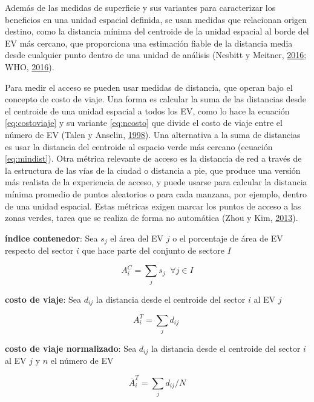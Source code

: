 \documentclass[12pt,a4paper,oneside, openany]{book}
\theoremstyle{definition}
\theoremstyle{definition}
\theoremstyle{definition}
\theoremstyle{remark}
\begin{document}
Además de las medidas de superficie y sus variantes para caracterizar
los beneficios en una unidad espacial definida, se usan medidas que
relacionan origen destino, como la distancia mínima del centroide de la
unidad espacial al borde del EV más cercano, que proporciona una
estimación fiable de la distancia media desde cualquier punto dentro de
una unidad de análisis (Nesbitt y Meitner,
\protect\hyperlink{ref-nesbitt_exploring_2016}{2016}; WHO,
\protect\hyperlink{ref-who2016urban}{2016}).

Para medir el acceso se pueden usar medidas de distancia, que operan
bajo el concepto de costo de viaje. Una forma es calcular la suma de las
distancias desde el centroide de una unidad espacial a todos los EV,
como lo hace la ecuación \eqref{eq:costoviaje} y su variante
\eqref{eq:ncosto} que divide el costo de viaje entre el número de EV
(Talen y Anselin, \protect\hyperlink{ref-talen_assessing_1998}{1998}).
Una alternativa a la suma de distancias es usar la distancia del
centroide al espacio verde más cercano (ecuación \eqref{eq:mindist}). Otra
métrica relevante de acceso es la distancia de red a través de la
estructura de las vías de la ciudad o distancia a pie, que produce una
versión más realista de la experiencia de acceso, y puede usarse para
calcular la distancia mínima promedio de puntos aleatorios o para cada
manzana, por ejemplo, dentro de una unidad espacial. Estas métricas
exigen marcar los puntos de acceso a las zonas verdes, tarea que se
realiza de forma no automática (Zhou y Kim,
\protect\hyperlink{ref-zhou_social_2013}{2013}).

\textbf{índice contenedor}: Sea \(s_j\) el área del EV \(j\) o el
porcentaje de área de EV respecto del sector \(i\) que hace parte del
conjunto de sectore \(I\)

\begin{equation}
A^{C}_i =\sum_j{s_j} \;  \; \forall  j \in I
\label{eq:contenedor}
\end{equation}

\textbf{costo de viaje}: Sea \(d_{ij}\) la distancia desde el centroide
del sector \(i\) al EV \(j\)

\begin{equation}
A^{T}_i =\sum_j{d_{ij}} \; 
\label{eq:costoviaje}
\end{equation}

\textbf{costo de viaje normalizado}: Sea \(d_{ij}\) la distancia desde
el centroide del sector \(i\) al EV \(j\) y \(n\) el número de EV

\begin{equation}
\bar{A}^{T}_i =\sum_j{d_{ij}/N}
\label{eq:ncosto}
\end{equation}
\end{document}
